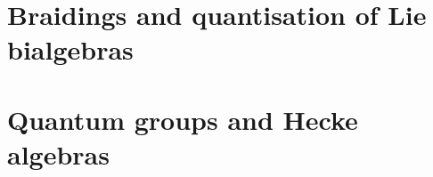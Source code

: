         \chapter{Braidings and quantisation of Lie bialgebras}
            \begin{abstract}
                
            \end{abstract}
            
            \minitoc
        
            

        \chapter{Quantum groups and Hecke algebras}
            \begin{abstract}
                
            \end{abstract}
            
            \minitoc

            

            
	
    \printbibliography

